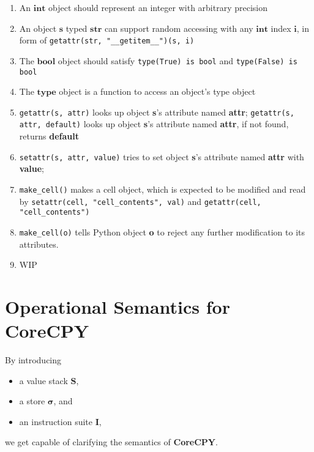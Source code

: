 \documentclass[12pt, a4paper]{report}
\begin{document}
\begin{enumerate}
\item An $\mathbf{int}$ object should represent an integer with arbitrary precision
\item An object $\mathbf{s}$ typed $\mathbf{str}$
can support random accessing with any $\mathbf{int}$ index $\mathbf{i}$,
in form of \lstinline!getattr(str, "__getitem__")(s, i)!
\item The $\mathbf{bool}$ object should satisfy \lstinline!type(True) is bool! and \lstinline!type(False) is bool!
\item The $\mathbf{type}$ object is a function to access an object's type object
\item \lstinline!getattr(s, attr)! looks up object \textbf{s}'s attribute named \textbf{attr};
      \lstinline!getattr(s, attr, default)! looks up object \textbf{s}'s attribute named \textbf{attr},
      if not found, returns \textbf{default}
\item \lstinline!setattr(s, attr, value)! tries to set object \textbf{s}'s attribute named \textbf{attr} with \textbf{value};
\item \lstinline!make_cell()! makes a cell object,
      which is expected to be modified and read by
      \lstinline!setattr(cell, "cell_contents", val)!
      and \lstinline!getattr(cell, "cell_contents")!
\item \lstinline!make_cell(o)! tells Python object \textbf{o} to reject any further modification to its attributes.
\item WIP
\end{enumerate}

\section* {Operational Semantics for \textbf{CoreCPY}}

By introducing 
\begin{itemize}
    \item a value stack $\mathbf{S}$,
    \item a store $\mathbf{\sigma}$, and
    \item an instruction suite $\mathbf{I}$,
\end{itemize}
we get capable of clarifying the semantics of \textbf{CoreCPY}.
\end{document}
